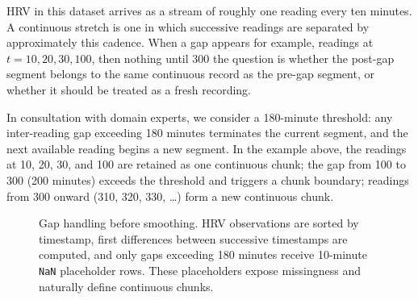 \documentclass[11pt, a4paper]{article}
\theoremstyle{plain}
\theoremstyle{definition}
\begin{document}
HRV in this dataset arrives as a stream of roughly one reading every ten
minutes. A continuous stretch is one in which successive readings are
separated by approximately this cadence. When a gap appears for example,
readings at $t = 10, 20, 30, 100$, then nothing until $300$ the question is
whether the post-gap segment belongs to the same continuous record as the
pre-gap segment, or whether it should be treated as a fresh recording.

In consultation with domain experts, we consider a 180-minute threshold:
any inter-reading gap exceeding 180 minutes terminates the current segment,
and the next available reading begins a new segment. In the example above,
the readings at 10, 20, 30, and 100 are retained as one continuous chunk;
the gap from 100 to 300 (200 minutes) exceeds the threshold and triggers a
chunk boundary; readings from 300 onward (310, 320, 330, \ldots) form a new
continuous chunk.

\begin{figure}[H]
\centering
{}
\caption{Gap handling before smoothing. HRV observations are sorted by
timestamp, first differences between successive timestamps are computed, and
only gaps exceeding 180 minutes receive 10-minute \texttt{NaN} placeholder
rows. These placeholders expose missingness and naturally define continuous
chunks.}
\label{fig:gap-chunking-flowchart}
\end{figure}
\end{document}

